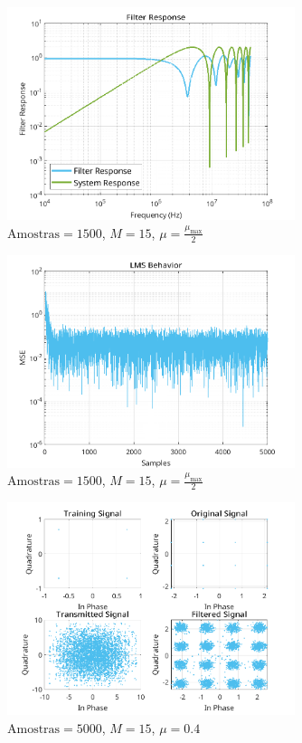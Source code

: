 \documentclass[a4paper,10pt]{article}
\begin{document}
\begin{enumerate}
				\begin{figure}[!ht]
					\centering
					\includegraphics[width=0.75\textwidth]{figs/L3Q5_filter_response.png}
					\caption{$\text{Amostras} = 1500$, $M = 15$, $\mu = \frac{\mu_{\text{max}}}{2}$}
					\label{fig:filter_response}
				\end{figure}

				\begin{figure}[!ht]
					\centering
					\includegraphics[width=0.75\textwidth]{figs/L3Q6_A_mse.png}
					\caption{$\text{Amostras} = 1500$, $M = 15$, $\mu = \frac{\mu_{\text{max}}}{2}$}
					\label{fig:L3Q6A1}
				\end{figure}

				\begin{figure}[!ht]
					\centering
					\includegraphics[width=0.75\textwidth]{figs/L3Q6_A_t.png}
					\caption{$\text{Amostras} = 5000$, $M = 15$, $\mu = 0.4$}
					\label{fig:L3Q6A2}
				\end{figure}


\end{enumerate}
\end{document}
